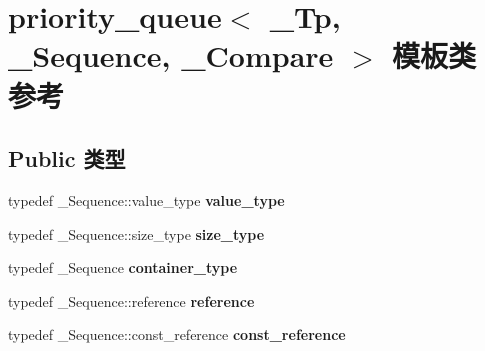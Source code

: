 \hypertarget{classpriority__queue}{}\section{priority\+\_\+queue$<$ \+\_\+\+Tp, \+\_\+\+Sequence, \+\_\+\+Compare $>$ 模板类 参考}
\label{classpriority__queue}
\subsection*{Public 类型}
\begin{DoxyCompactItemize}
\item 
\mbox{\label{classpriority__queue_a32d0ff3edb29f68107f8246b7b3a27ef}} 
typedef \+\_\+\+Sequence\+::value\+\_\+type {\bfseries value\+\_\+type}
\item 
\mbox{\label{classpriority__queue_a509b7d31a3ec4b2349f16c17a544828f}} 
typedef \+\_\+\+Sequence\+::size\+\_\+type {\bfseries size\+\_\+type}
\item 
\mbox{\label{classpriority__queue_a6c435e0e29853c9d58943a4e0eb13130}} 
typedef \+\_\+\+Sequence {\bfseries container\+\_\+type}
\item 
\mbox{\label{classpriority__queue_abd29cd2de1162d7471c21dc16028bc51}} 
typedef \+\_\+\+Sequence\+::reference {\bfseries reference}
\item 
\mbox{\label{classpriority__queue_a7004ff72718a3c724bdb32d6df039c96}} 
typedef \+\_\+\+Sequence\+::const\+\_\+reference {\bfseries const\+\_\+reference}
\end{DoxyCompactItemize}

